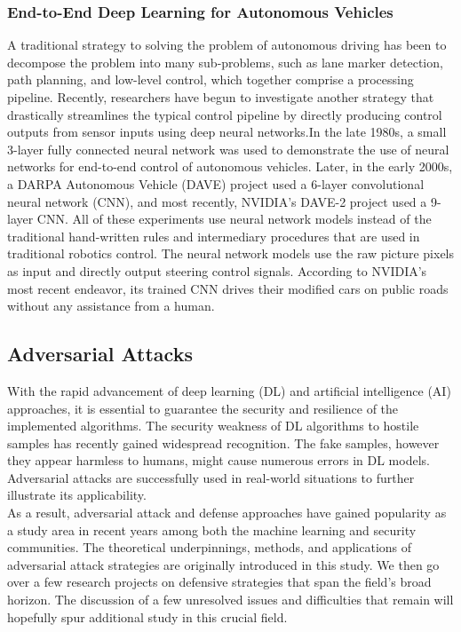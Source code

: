 \documentclass[ 12pt,a4paper,twocolumn,fleqn]{article}
\begin{document}
\subsubsection{End-to-End Deep Learning for Autonomous Vehicles}
A traditional strategy to solving the problem of autonomous driving has been to decompose the problem into many sub-problems, such as lane marker detection, path planning, and low-level control, which together comprise a processing pipeline. Recently, researchers have begun to investigate another strategy that drastically streamlines the typical control pipeline by directly producing control outputs from sensor inputs using deep neural networks.In the late 1980s, a small 3-layer fully connected neural network was used to demonstrate the use of neural networks for end-to-end control of autonomous vehicles. Later, in the early 2000s, a DARPA Autonomous Vehicle (DAVE) project  used a 6-layer convolutional neural network (CNN), and most recently, NVIDIA's DAVE-2 project used a 9-layer CNN. All of these experiments use neural network models instead of the traditional hand-written rules and intermediary procedures that are used in traditional robotics control. The neural network models use the raw picture pixels as input and directly output steering control signals. According to NVIDIA's most recent endeavor, its trained CNN drives their modified cars on public roads without any assistance from a human.\\
\subsection{Adversarial Attacks}
With the rapid advancement of deep learning (DL) and artificial intelligence (AI) approaches, it is essential to guarantee the security and resilience of the implemented algorithms. The security weakness of DL algorithms to hostile samples has recently gained widespread recognition. The fake samples, however they appear harmless to humans, might cause numerous errors in DL models. Adversarial attacks are successfully used in real-world situations to further illustrate its applicability.\\
%
As a result, adversarial attack and defense approaches have gained popularity as a study area in recent years among both the machine learning and security communities. The theoretical underpinnings, methods, and applications of adversarial attack strategies are originally introduced in this study. We then go over a few research projects on defensive strategies that span the field's broad horizon. The discussion of a few unresolved issues and difficulties that remain will hopefully spur additional study in this crucial field.\\
\end{document}
